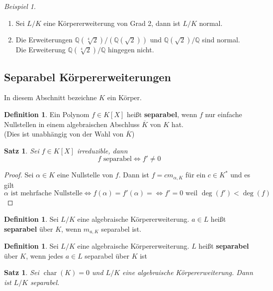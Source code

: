 \documentclass[10pt,a4paper]{article}
\newcommand{\Q}{\ensuremath{\mathbb{Q}}}
\newcommand{\al}{\ensuremath{\alpha}}
\newcommand{\ol}[1]{\overline{#1}}
\newcommand{\cha}{\operatorname{char}}
\theoremstyle{plain}
\newtheorem{satz}[theorem]{Satz}
\theoremstyle{definition}
\newtheorem{definition}[theorem]{Definition}
\theoremstyle{remark}
\newtheorem{exm}[theorem]{Beispiel}
\begin{document}
	\begin{exm}
		\begin{enumerate}
			\item Sei $L/K$ eine Körpererweiterung von Grad 2, dann ist $L/K$ normal.
			\item Die Erweiterungen $\Q(\sqrt[4]{2})/(\Q(\sqrt{2}))$ und $\Q(\sqrt{2})/\Q$ sind normal.\\
			Die Erweiterung $\Q(\sqrt[4]{2})/\Q$ hingegen nicht.
		\end{enumerate}
	\end{exm}


\subsection{Separabel Körpererweiterungen}
In diesem Abschnitt bezeichne $K$ ein Körper.

	\begin{definition}
		Ein Polynom $f\in K[X]$ heißt \textbf{separabel}, wenn $f$ nur einfache Nullstellen in einem algebraischen Abschluss $\ol K$ von $K$ hat.\\
		(Dies ist unabhängig von der Wahl von $\ol K$)
	\end{definition}

	\begin{satz}
		Sei $f\in K[X]$ irreduzible, dann
		\[\text{$f$ separabel}\Leftrightarrow f'\neq 0\]
	\end{satz}
	\begin{proof}
		Sei $\al\in K$ eine Nullstelle von $f$. Dann ist $f=cm_{\al,K}$ für ein $c\in K^*$ und  es gilt
		\[\text{$\al$ ist mehrfache Nullstelle}\Leftrightarrow f(\al)=f'(\al)=\Leftrightarrow \text{$f'=0$ weil $\deg(f')<\deg(f)$}\]
	\end{proof}

	\begin{definition}
		Sei $L/K$ eine algebraische Körpererweiterung. $a\in L$ heißt \textbf{separabel} über $K$, wenn $m_{a,K}$ separabel ist.
	\end{definition}

	\begin{definition}
		Sei $L/K$ eine algebraische Körpererweiterung. $L$ heißt \textbf{separabel} über $K$, wenn jedes $a\in L$ separabel über $K$ ist
	\end{definition}


	\begin{satz}
		Sei $\cha(K)=0$ und $L/K$ eine algebraische Körpererweiterung. Dann ist $L/K$ separabel.
	\end{satz}
\end{document}
